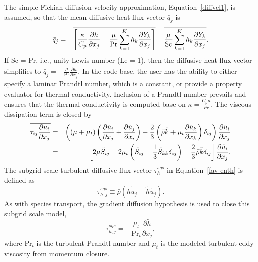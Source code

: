 The simple Fickian diffusion velocity approximation, Equation~\ref{diffvel1},
is assumed, so that the mean diffusive heat flux vector $\bar{q}_j$ is
%
\begin{eqnarray}
  \bar{q}_j = - \overline{ \left[ {\kappa \over {C_p}}
                       {{\partial h} \over {\partial x_j}}
                 -  {\mu \over {\rm Pr}} 
        \sum_{k=1}^K h_k {{\partial Y_k} \over {\partial x_j}} \right] }
     - \overline{ {\mu \over {\rm Sc}}
        \sum_{k=1}^K h_k {{\partial Y_k} \over {\partial x_j}} }.
\end{eqnarray}
%
If Sc = Pr, i.e., unity Lewis number (Le = 1), then the diffusive heat
flux vector simplifies to $\bar{q}_j = -\frac{\mu}{\mathrm{Pr}}
\frac{\partial \tilde{h}}{\partial x_j}$.  In the code base, the user
has the ability to either specify a laminar Prandtl number, which is
a constant, or provide a property evaluator for thermal conductivity. Inclusion
of a Prandtl number prevails and ensures that the thermal conductivity is computed
base on $\kappa = \frac{C_p \mu}{Pr}$. The viscous dissipation term is closed by
%
\begin{eqnarray}
\overline{\tau_{ij} {{\partial u_i} \over {\partial x_j }}}
  &=& \left(\left(\mu + \mu_t\right) \left( {{\partial \tilde{u}_i} 
      \over {\partial x_j}}
    + {{\partial \tilde{u}_j} \over {\partial x_i}} \right)
    - {2 \over 3} \left( \bar{\rho} \tilde{k} + 
      \mu_t{{\partial \tilde{u}_k} \over {\partial x_k}} \right)
      \delta_{ij} \right) {{\partial \tilde{u}_i} \over {\partial x_j}}
      \nonumber \\
  &=& \left[ 2 \mu \tilde{S}_{ij} 
    + 2 \mu_t \left( \tilde{S}_{ij} - \frac{1}{3} \tilde{S}_{kk}
      \delta_{ij} \right) - \frac{2}{3} \bar{\rho} \tilde{k}
      \delta_{ij} \right] \frac{\partial \tilde{u}_i}{\partial x_j}.
\end{eqnarray}
%
The subgrid scale turbulent diffusive flux vector $\tau^{sgs}_{h }$ in Equation~\ref{fav-enth}
is defined as
%
\begin{equation}
\tau^{sgs}_{h,j} \equiv \bar{\rho} \left( \widetilde{h u_j} - 
     \tilde{h} \tilde{u}_j \right).
\end{equation}
%
As with species transport, the gradient diffusion hypothesis is used to close
this subgrid scale model,
\begin{equation}
\tau^{sgs}_{h,j} = - \frac{\mu_t}{\mathrm{Pr}_t} \frac{\partial \tilde{h}}{\partial x_j},
\end{equation}
%
where $\mathrm{Pr}_t$ is the turbulent Prandtl number and $\mu_t$ is 
the modeled turbulent eddy viscosity from momentum closure.  

